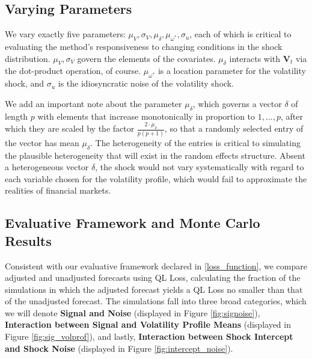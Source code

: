 \documentclass[11pt,3p,review,authoryear]{elsarticle}
\theoremstyle{definition}
\begin{document}
  \subsection{Varying Parameters}

  We vary exactly five parameters: $\mu_{V}, \sigma_{V}, \mu_{\delta}, \mu_{\omega^{*}}, \sigma_{u}$, each of which is critical to evaluating the method's responsiveness to changing conditions in the shock distribution. $\mu_{V}, \sigma_{V}$ govern the elements of the covariates. $\mu_{\delta}$ interacts with $\textbf{V}_{t}$ via the dot-product operation, of course.  $\mu_{\omega^{*}}$ is a location parameter for the volatility shock, and $\sigma_{u}$ is the idiosyncratic noise of the volatility shock.
  
  We add an important note about the parameter $\mu_{\delta}$, which governs a vector $\delta$ of length $p$ with elements that increase monotonically in proportion to $1,...,p$, after which they are scaled by the factor $\frac{2\cdot\mu_{\delta}}{p(p+1)}$, so that a randomly selected entry of the vector has mean $\mu_{\delta}$.  The heterogeneity of the entries is critical to simulating the plausible heterogeneity that will exist in the random effects structure.  Absent a heterogeneous vector $\delta$, the shock would not vary systematically with regard to each variable chosen for the volatility profile, which would fail to approximate the realities of financial markets.

\subsection{Evaluative Framework and Monte Carlo Results}
Consistent with our evaluative framework declared in \ref{loss_function}, we compare adjusted and unadjusted forecasts using QL Loss, calculating the fraction of the simulations in which the adjusted forecast yields a QL Loss no smaller than that of the unadjusted forecast.  The simulations fall into three broad categories, which we will denote \textbf{Signal and Noise} (displayed in Figure \ref{fig:signoise}), \textbf{Interaction between Signal and Volatility Profile Means} (displayed in Figure \ref{fig:sig_volprof}), and lastly, \textbf{Interaction between Shock Intercept and Shock Noise} (displayed in Figure \ref{fig:intercept_noise}).  
\end{document}
